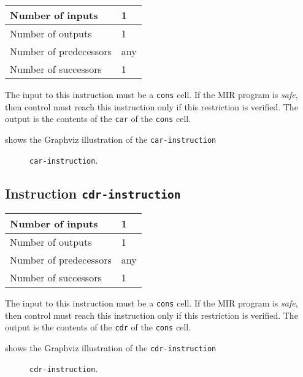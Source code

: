 \begin{tabular}{|l|l|}
\hline
Number of inputs & 1\\
\hline
Number of outputs & 1\\
\hline
Number of predecessors & any\\
\hline
Number of successors & 1\\
\hline
\end{tabular}

The input to this instruction must be a \texttt{cons} cell.  If the
MIR program is \emph{safe}, then control must reach this instruction
only if this restriction is verified.  The output is the contents of
the \texttt{car} of the \texttt{cons} cell.

 shows the Graphviz illustration of the
\texttt{car-instruction}

\begin{figure}
\begin{center}
\end{center}
\caption{\label{fig-car-instruction}
\texttt{car-instruction}.}
\end{figure}

\subsection{Instruction \texttt{cdr-instruction}}
\label{mir-instruction-cdr}

\begin{tabular}{|l|l|}
\hline
Number of inputs & 1\\
\hline
Number of outputs & 1\\
\hline
Number of predecessors & any\\
\hline
Number of successors & 1\\
\hline
\end{tabular}

The input to this instruction must be a \texttt{cons} cell.  If the
MIR program is \emph{safe}, then control must reach this instruction
only if this restriction is verified.  The output is the contents of
the \texttt{cdr} of the \texttt{cons} cell.

 shows the Graphviz illustration of the
\texttt{cdr-instruction}

\begin{figure}
\begin{center}
\end{center}
\caption{\label{fig-cdr-instruction}
\texttt{cdr-instruction}.}
\end{figure}

